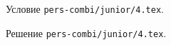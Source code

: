 \problem
Условие \texttt{pers-combi/junior/4.tex}.

\solution Решение \texttt{pers-combi/junior/4.tex}.
\endproblem
